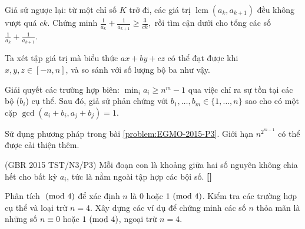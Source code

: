 \documentclass[./m.tex]{subfiles}
\begin{document}
\begin{hint*}
	Giả sử ngược lại: từ một chỉ số \( K \) trở đi, các giá trị \( \operatorname{lcm}(a_k, a_{k+1}) \) đều không vượt quá \( ck \).  
	Chứng minh $\frac{1}{a_k} + \frac{1}{a_{k+1}} \ge \frac{3}{ck},$ rồi tìm cận dưới cho tổng các số \( \frac{1}{a_k} + \frac{1}{a_{k+1}} \).
\end{hint*}

\vspace{1em}

\begin{hint*}
	Ta xét tập giá trị mà biểu thức \( ax + by + cz \) có thể đạt được khi \( x, y, z \in [-n, n] \), và so sánh với số lượng bộ ba như vậy.  
\end{hint*}

\vspace{1em}

\begin{hint*}
	Giải quyết các trường hợp biên: $\min_{i} a_i \ge n^m - 1$ qua việc chỉ ra sự tồn tại các bộ ($b_i$) cụ thể.
	Sau đó, giả sử phản chứng với \(b_1, \ldots, b_m \in \{1, \ldots, n\}\) sao cho có một cặp $\gcd(a_i + b_i, a_j + b_j) = 1.$
\end{hint*}

\vspace{1em}

\begin{hint*}
	Sử dụng phương pháp trong bài \autoref{problem:EGMO-2015-P3}. Giới hạn \( n^{2^{m-1}} \) có thể được cải thiện thêm.
\end{hint*}

\vspace{1em}

\begin{hint*}(\gls{GBR 2015 TST}/N3/P3)
    Mỗi đoạn con là khoảng giữa hai số nguyên không chia hết cho bất kỳ \( a_i \), tức là nằm ngoài tập hợp các bội số.
	\textbf{[]}
\end{hint*}

\vspace{1em}

\begin{hint*}
	Phân tích \(\ (\mathrm{mod}\ 4)\) để xác định \(n\) là \(0\) hoặc \(1 \ (\mathrm{mod}\ 4)\). Kiểm tra các trường hợp cụ thể và loại trừ \(n = 4\).
	Xây dựng các ví dụ để chứng minh các số \(n\) thỏa mãn là những số \(n \equiv 0\) hoặc \(1 \ (\mathrm{mod}\ 4)\), ngoại trừ \(n = 4\).
\end{hint*}
\end{document}
